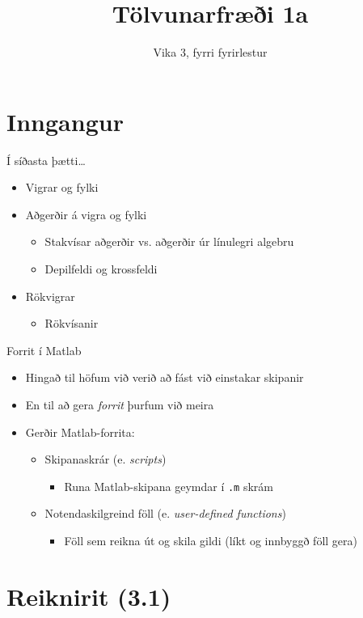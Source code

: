 \documentclass{beamer}
\title{Tölvunarfræði 1a}
\subtitle{Vika 3, fyrri fyrirlestur}
\begin{document}
\begin{frame}
\titlepage
\end{frame}

\section{Inngangur}

\begin{frame}{Í síðasta þætti\ldots}
\begin{itemize}
 \item Vigrar og fylki
 \item Aðgerðir á vigra og fylki
 \begin{itemize}
  \item Stakvísar aðgerðir vs. aðgerðir úr línulegri algebru
  \item Depilfeldi og krossfeldi
 \end{itemize}
 \item Rökvigrar
 \begin{itemize}
  \item Rökvísanir
 \end{itemize}
\end{itemize}
\end{frame}

\begin{frame}{Forrit í Matlab}
\begin{itemize}
 \item Hingað til höfum við verið að fást við einstakar skipanir
 \item En til að gera \emph{forrit} þurfum við meira
 \item Gerðir Matlab-forrita:
 \begin{itemize}
  \item Skipanaskrár (e. \emph{scripts})
  \begin{itemize}
   \item Runa Matlab-skipana geymdar í \texttt{.m} skrám
  \end{itemize}
  \item Notendaskilgreind föll (e. \emph{user-defined functions})
  \begin{itemize}
   \item Föll sem reikna út og skila gildi (líkt og innbyggð föll gera)
  \end{itemize}
 \end{itemize}
\end{itemize}
\end{frame}

\section{Reiknirit (3.1)}
\end{document}
